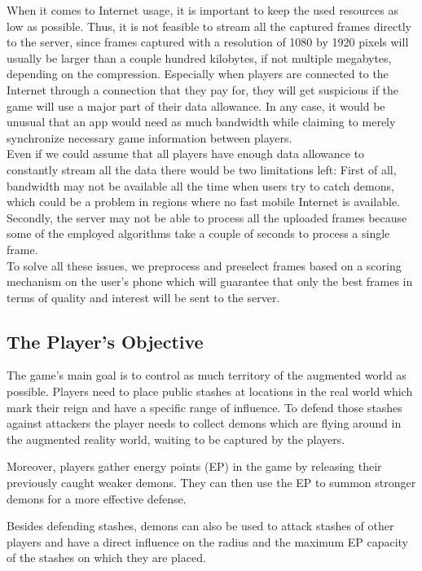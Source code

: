 When it comes to Internet usage, it is important to keep the used resources as low as possible. 
Thus, it is not feasible to stream all the captured frames directly to the server, since frames captured with a resolution of 1080 by 1920 pixels will usually be larger than a couple hundred kilobytes, if not multiple megabytes, depending on the compression.
Especially when players are connected to the Internet through a connection that they pay for, they will get suspicious if the game will use a major part of their data allowance.
In any case, it would be unusual that an app would need as much bandwidth while claiming to merely synchronize necessary game information between players.\\
Even if we could assume that all players have enough data allowance to constantly stream all the data there would be two limitations left:
First of all, bandwidth may not be available all the time when users try to catch demons, which could be a problem in regions where no fast mobile Internet is available.
Secondly, the server may not be able to process all the uploaded frames because some of the employed algorithms take a couple of seconds to process a single frame.\\
To solve all these issues, we preprocess and preselect frames based on a scoring mechanism on the user's phone which will guarantee that only the best frames in terms of quality and interest will be sent to the server.


\subsection{The Player's Objective}

The game's main goal is to control as much territory of the augmented world as possible.
Players need to place public stashes at locations in the real world which mark their reign and have a specific range of influence. 
To defend those stashes against attackers the player needs to collect demons which are flying around in the augmented reality world, waiting to be captured by the players. 

Moreover, players gather energy points (EP) in the game by releasing their previously caught weaker demons. They can then use the EP to summon stronger demons for a more effective defense.

Besides defending stashes, demons can also be used to attack stashes of other players and have a direct influence on the radius and the maximum EP capacity of the stashes on which they are placed.

